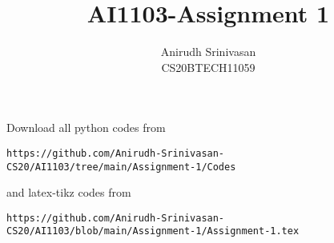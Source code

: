 \documentclass[journal,12pt,twocolumn]{IEEEtran}
\DeclareMathOperator*{\Res}{Res}
\begin{document}
\newcommand{\BEQA}{\begin{eqnarray}}
\newcommand{\EEQA}{\end{eqnarray}}
\newcommand{\define}{\stackrel{\triangle}{=}}

\raggedbottom
\setlength{\parindent}{0pt}
\providecommand{\mbf}{\mathbf}
\providecommand{\pr}[1]{\ensuremath{\Pr\left(#1\right)}}
\providecommand{\qfunc}[1]{\ensuremath{Q\left(#1\right)}}
\providecommand{\sbrak}[1]{\ensuremath{{}\left[#1\right]}}
\providecommand{\lsbrak}[1]{\ensuremath{{}\left[#1\right.}}
\providecommand{\rsbrak}[1]{\ensuremath{{}\left.#1\right]}}
\providecommand{\brak}[1]{\ensuremath{\left(#1\right)}}
\providecommand{\lbrak}[1]{\ensuremath{\left(#1\right.}}
\providecommand{\rbrak}[1]{\ensuremath{\left.#1\right)}}
\providecommand{\cbrak}[1]{\ensuremath{\left\{#1\right\}}}
\providecommand{\lcbrak}[1]{\ensuremath{\left\{#1\right.}}
\providecommand{\rcbrak}[1]{\ensuremath{\left.#1\right\}}}
\theoremstyle{remark}
\newtheorem{rem}{Remark}
\newcommand{\sgn}{\mathop{\mathrm{sgn}}}
\providecommand{\abs}[1]{\vert#1\vert}
\providecommand{\res}[1]{\Res\displaylimits_{#1}} 
\providecommand{\norm}[1]{\lVert#1\rVert}
\providecommand{\mtx}[1]{\mathbf{#1}}
\providecommand{\mean}[1]{E[ #1 ]}
\providecommand{\fourier}{\overset{\mathcal{F}}{ \rightleftharpoons}}
\providecommand{\system}{\overset{\mathcal{H}}{ \longleftrightarrow}}
\newcommand{\solution}{\noindent \textbf{Solution: }}
\newcommand{\cosec}{\,\text{cosec}\,}
\providecommand{\dec}[2]{\ensuremath{\overset{#1}{\underset{#2}{\gtrless}}}}
\newcommand{\myvec}[1]{\ensuremath{\begin{pmatrix}#1\end{pmatrix}}}
\newcommand{\mydet}[1]{\ensuremath{\begin{vmatrix}#1\end{vmatrix}}}
\makeatletter
{}
\makeatother
\let\StandardTheFigure\thefigure
\let\vec\mathbf
\renewcommand{\thefigure}{\theproblem}
\def\putbox#1#2#3{\makebox[0in][l]{\makebox[#1][l]{}\raisebox{\baselineskip}[0in][0in]{\raisebox{#2}[0in][0in]{#3}}}}
     \def\rightbox#1{\makebox[0in][r]{#1}}
     \def\centbox#1{\makebox[0in]{#1}}
     \def\topbox#1{\raisebox{-\baselineskip}[0in][0in]{#1}}
     \def\midbox#1{\raisebox{-0.5\baselineskip}[0in][0in]{#1}}
\vspace{3cm}
\title{AI1103-Assignment 1}
\author{Anirudh Srinivasan\\CS20BTECH11059}
\maketitle
\newpage
\bigskip
\renewcommand{\thefigure}{\theenumi}
\renewcommand{\thetable}{\theenumi}
Download all python codes from 
\begin{lstlisting}
https://github.com/Anirudh-Srinivasan-CS20/AI1103/tree/main/Assignment-1/Codes
\end{lstlisting}
%
and latex-tikz codes from 
%
\begin{lstlisting}
https://github.com/Anirudh-Srinivasan-CS20/AI1103/blob/main/Assignment-1/Assignment-1.tex
\end{lstlisting}
\end{document}
